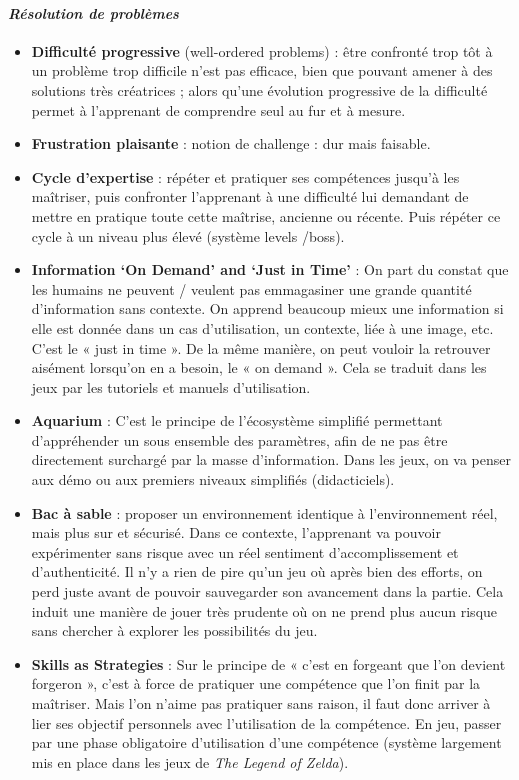 			\paragraph{\emph{Résolution de problèmes}}
			\begin{itemize}
				\item {\textbf{Difficulté progressive} (well-ordered problems)} : être confronté trop tôt à un problème
trop difficile n'est pas efficace, bien que pouvant amener à des solutions très créatrices ;
alors qu'une évolution progressive de la difficulté permet à l'apprenant de comprendre seul au fur et à mesure.
				\item {\textbf{Frustration plaisante}} : notion de challenge : dur mais faisable.
				\item {\textbf{Cycle d'expertise}} : répéter et pratiquer ses compétences jusqu'à les maîtriser, puis confronter l'apprenant à une difficulté lui demandant de mettre en pratique toute cette maîtrise, ancienne ou récente. Puis répéter ce cycle à un niveau plus élevé (système levels /boss).
				\item {\textbf{Information ‘On Demand’ and ‘Just in Time’}} :
On part du constat que les humains ne peuvent / veulent pas emmagasiner une grande quantité d'information sans contexte. On apprend beaucoup mieux une information si elle est donnée dans un cas d'utilisation, un contexte, liée à une image, etc. C'est le « just in time ». De la même manière, on peut vouloir la retrouver aisément lorsqu'on en a besoin, le « on demand ». Cela se traduit dans les jeux par les tutoriels et manuels d'utilisation.
				\item {\textbf{Aquarium}} : C'est le principe de l'écosystème simplifié permettant d'appréhender un sous ensemble des paramètres, afin de ne pas être directement surchargé par la masse d'information. Dans les jeux, on va penser aux démo ou aux premiers niveaux simplifiés (didacticiels). 
				\item {\textbf{Bac à sable}} : proposer un environnement identique à l'environnement réel, mais plus sur et sécurisé. Dans ce contexte, l'apprenant va pouvoir expérimenter sans risque avec un réel sentiment d'accomplissement et d'authenticité. Il n'y a rien de pire qu'un jeu où après bien des efforts, on perd juste avant de pouvoir sauvegarder son avancement dans la partie. Cela induit une manière de jouer très prudente où on ne prend plus aucun risque sans chercher à explorer les possibilités du jeu.
				\item {\textbf{Skills as Strategies}} : Sur le principe de « c'est en forgeant que l'on devient forgeron », c'est à force de pratiquer une compétence que l'on finit par la maîtriser. Mais l'on n'aime pas pratiquer sans raison, il faut donc arriver à lier ses objectif personnels avec l'utilisation de la compétence. En jeu, passer par une phase obligatoire d'utilisation d'une compétence (système largement mis en place dans les jeux de \emph{The Legend of Zelda}).
		\end{itemize}
